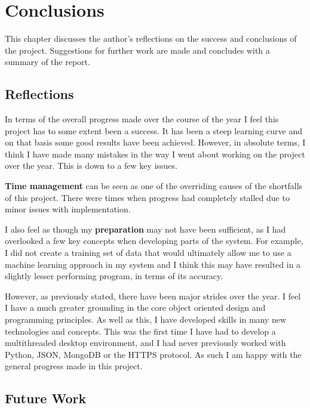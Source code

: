 \chapter{Conclusions}
\label{cha:conclusion}
This chapter discusses the author's reflections on the success and conclusions of the project. Suggestions for further work are made and concludes with a summary of the report. 

\section{Reflections}
In terms of the overall progress made over the course of the year I feel this project has to some extent been a success. It has been a steep learning curve and on that basis some good results have been achieved. However, in absolute terms, I think I have made many mistakes in the way I went about working on the project over the year. This is down to a few key issues.

\textbf{Time management} can be seen as one of the overriding causes of the shortfalls of this project. There were times when progress had completely stalled due to minor issues with implementation.

I also feel as though my \textbf{preparation} may not have been sufficient, as I had overlooked a few key concepts when developing parts of the system. For example, I did not create a training set of data that would ultimately allow me to use a machine learning approach in my system and I think this may have resulted in a slightly lesser performing program, in terms of its accuracy.

However, as previously stated, there have been major strides over the year. I feel I have a much greater grounding in the core object oriented design and programming principles. As well as this, I have developed skills in many new technologies and concepts. This was the first time I have had to develop a multithreaded desktop environment, and I had never previously worked with Python, JSON, MongoDB or the HTTPS protocol. As such I am happy with the general progress made in this project.

\section{Future Work}

